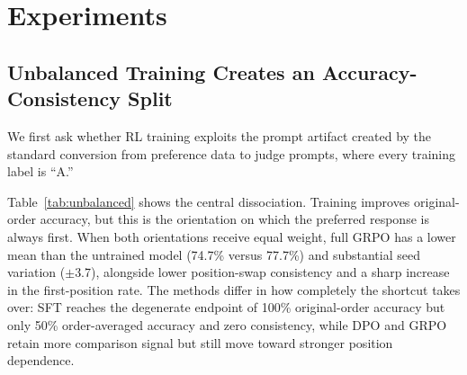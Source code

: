 \documentclass[letterpaper]{article}
\begin{document}
\section{Experiments}

\subsection{Unbalanced Training Creates an Accuracy-Consistency Split}

We first ask whether RL training exploits the prompt artifact created by the standard conversion from preference data to judge prompts, where every training label is ``A.''

Table~\ref{tab:unbalanced} shows the central dissociation. Training improves original-order accuracy, but this is the orientation on which the preferred response is always first. When both orientations receive equal weight, full GRPO has a lower mean than the untrained model (74.7\% versus 77.7\%) and substantial seed variation ($\pm$3.7), alongside lower position-swap consistency and a sharp increase in the first-position rate. The methods differ in how completely the shortcut takes over: SFT reaches the degenerate endpoint of 100\% original-order accuracy but only 50\% order-averaged accuracy and zero consistency, while DPO and GRPO retain more comparison signal but still move toward stronger position dependence.
\end{document}
